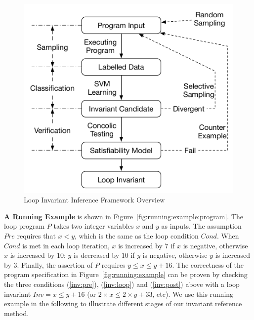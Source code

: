 \begin{figure}[t]
    \centering
    \includegraphics[scale=0.45]{figures/overview.pdf}
    \caption{Loop Invariant Inference Framework Overview}
    \label{fig:overview}
\end{figure}

\medskip\noindent
\textbf{A Running Example}
is shown in Figure~\ref{fig:running:example:program}. 
The loop program $P$ takes two integer variables $x$ and $y$ as inputs. 
The assumption $\mathit{Pre}$ requires that $x < y$, 
which is the same as the loop condition $\mathit{Cond}$. 
When $\mathit{Cond}$ is met in each loop iteration, 
$x$ is increased by $7$ if $x$ is negative, otherwise $x$ is increased by $10$; 
$y$ is decreased by $10$ if $y$ is negative, otherwise $y$ is increased by $3$. 
Finally, the assertion of $P$ requires $y \le x \le y + 16$. 
The correctness of the program specification in Figure~\ref{fig:running:example} 
can be proven by checking the three conditions 
(\ref{inv:pre}), (\ref{inv:loop}) and (\ref{inv:post}) above 
with a loop invariant $\mathit{Inv} = x \le y + 16$ (or $2 \times x \le 2 \times y + 33$, etc). 
We use this running example in the following 
to illustrate different stages of our invariant reference method. 

